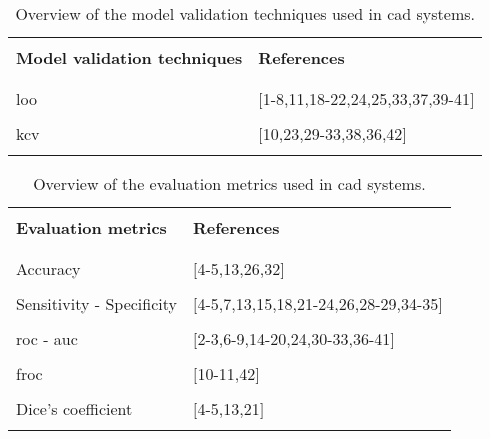 \begin{table}
	\caption{Overview of the model validation techniques used in \ac{cad} systems.}
	\small
	\begin{tabular}{p{.55\linewidth} p{.35\linewidth}}
		\hline \\ [-1.5ex]
		\textbf{Model validation techniques} & \textbf{References} \\ \\ [-1.5ex]
		\hline \\ [-1.5ex]
		\quad \acs{loo} & $[$1-8,11,18-22,24,25,33,37,39-41$]$ \\ \\ [-1.5ex]
		\quad \acs{kcv} & $[$10,23,29-33,38,36,42$]$ \\ \\ [-1.5ex]
		\hline
	\end{tabular}
	\label{tab:valmod}
\end{table}


\begin{table}
	\caption{Overview of the evaluation metrics used in \ac{cad} systems.}
	\small
	\renewcommand{\arraystretch}{.8}
	\begin{tabular}{p{.55\linewidth} p{.35\linewidth}}
		\hline \\ [-1.5ex]
		\textbf{Evaluation metrics} & \textbf{References} \\ \\ [-1.5ex]
		\hline \\ [-1.5ex]
		\quad Accuracy & $[$4-5,13,26,32$]$ \\ \\ [-1.5ex]
		\quad Sensitivity - Specificity & $[$4-5,7,13,15,18,21-24,26,28-29,34-35$]$ \\ \\ [-1.5ex]
		\quad \acs{roc} - \acs{auc} & $[$2-3,6-9,14-20,24,30-33,36-41$]$ \\ \\ [-1.5ex]
		\quad \acs{froc} & $[$10-11,42$]$ \\ \\ [-1.5ex]
		\quad Dice's coefficient & $[$4-5,13,21$]$ \\ \\ [-1.5ex]
		\hline
	\end{tabular}
	\label{tab:evatec}
\end{table}

